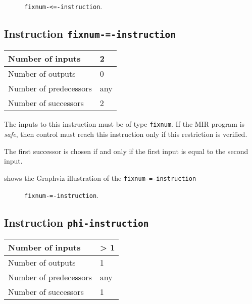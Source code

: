 \begin{figure}
\begin{center}
\end{center}
\caption{\label{fig-fixnum-le-instruction}
\texttt{fixnum-<=-instruction}.}
\end{figure}

\subsection{Instruction \texttt{fixnum-=-instruction}}
\label{mir-instruction-fixnum-equal}

\begin{tabular}{|l|l|}
\hline
Number of inputs & 2\\
\hline
Number of outputs & 0\\
\hline
Number of predecessors & any\\
\hline
Number of successors & 2\\
\hline
\end{tabular}

The inputs to this instruction must be of type \texttt{fixnum}.  If the
MIR program is \emph{safe}, then control must reach this instruction
only if this restriction is verified.

The first successor is chosen if and only if the first input is equal
to the second input.

 shows the Graphviz illustration of the
\texttt{fixnum-=-instruction}

\begin{figure}
\begin{center}
\end{center}
\caption{\label{fig-fixnum-equal-instruction}
\texttt{fixnum-=-instruction}.}
\end{figure}

\subsection{Instruction \texttt{phi-instruction}}
\label{mir-instruction-phi}

\begin{tabular}{|l|l|}
\hline
Number of inputs & > 1\\
\hline
Number of outputs & 1\\
\hline
Number of predecessors & any\\
\hline
Number of successors & 1\\
\hline
\end{tabular}

